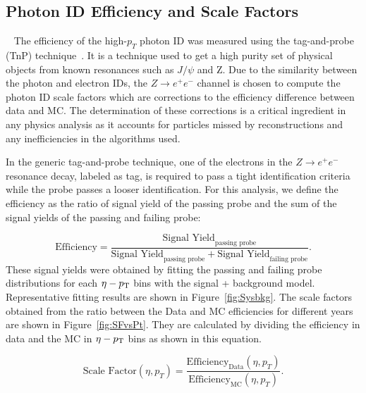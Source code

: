 

\subsection{Photon ID Efficiency and Scale Factors}~\label{selection_efficiency}
The efficiency of the high-$p_{T}$ photon ID was measured using the tag-and-probe (TnP) technique~\cite{generic_TnP}. It is a technique used to get a high purity set of physical objects from known resonances such as $J/\psi$ and Z. Due to the similarity between the photon and electron IDs, the $Z \to e^{+}e^{-}$ channel is chosen to compute the photon ID scale factors which are corrections to the efficiency difference between data and MC. The determination of these corrections is a critical ingredient in any physics analysis as it accounts for particles missed by reconstructions and any inefficiencies in the algorithms used. 

In the generic tag-and-probe technique, one of the electrons in the $Z \to e^{+}e^{-}$ resonance decay, labeled as tag, is required to pass a tight identification criteria while the probe passes a looser identification. For this analysis, we define the efficiency as the ratio of signal yield of the passing probe and the sum of the signal yields of the passing and failing probe:

\begin{equation} \label{eq:efficiency}
  \text{Efficiency} = \frac{\text{Signal Yield}_{\text{passing probe}}}{\text{Signal Yield}_{\text{passing probe}} + \text{Signal Yield}_{\text{failing probe}}}.
\end{equation}
These signal yields were obtained by fitting the passing and failing probe distributions for each $\eta-p_{\mathrm{T}}$ bins with the signal + background model. Representative fitting results are shown in Figure~\ref{fig:Sysbkg}. The scale factors obtained from the ratio between the Data and MC efficiencies for different years are shown in Figure~\ref{fig:SFvsPt}. They are calculated by dividing the efficiency in data and the MC in $\eta-p_{\mathrm{T}}$ bins as shown in this equation. 

\begin{equation} \label{eq:SF}
  \text{Scale Factor}(\eta,p_{T}) = \frac{\text{Efficiency}_{\text{Data}}(\eta,p_{T})}{\text{Efficiency}_{\text{MC}}(\eta,p_{T})}.
\end{equation}

